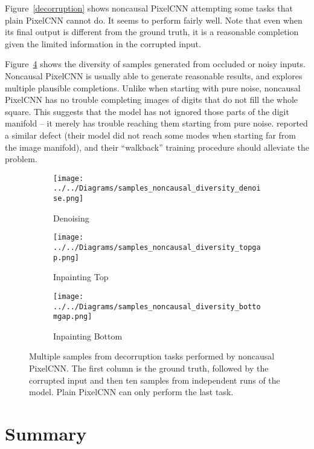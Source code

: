 \documentclass[11pt, a4paper, openany]{book}
\newcommand{\nquote}[1]{``{#1}''}
\begin{document}
Figure~\ref{decorruption} shows noncausal PixelCNN attempting some tasks that plain PixelCNN cannot do. It seems to perform fairly well. Note that even when its final output is different from the ground truth, it is a reasonable completion given the limited information in the corrupted input.

Figure~\ref{diversity} shows the diversity of samples generated from occluded or noisy inputs. Noncausal PixelCNN is usually able to generate reasonable results, and explores multiple plausible completions. Unlike when starting with pure noise, noncausal PixelCNN has no trouble completing images of digits that do not fill the whole square. This suggests that the model has not ignored those parts of the digit manifold -- it merely has trouble reaching them starting from pure noise. \citet{denoisinggenerative} reported a similar defect (their model did not reach some modes when starting far from the image manifold), and their \nquote{walkback} training procedure should alleviate the problem.

\begin{figure}
  \centering    
    \begin{subfigure}{0.32\columnwidth}
        \centering
        \caption{Denoising}
        \texttt{[image: ../../Diagrams/samples\_noncausal\_diversity\_denoise.png]} 
        \label{diversity:denoise}
    \end{subfigure}
    \hfill
    \begin{subfigure}{0.32\columnwidth}
        \centering
        \caption{Inpainting Top}
        \texttt{[image: ../../Diagrams/samples\_noncausal\_diversity\_topgap.png]} 
        \label{diversity:topgap}
    \end{subfigure}
    \hfill
    \begin{subfigure}{0.32\columnwidth}
        \centering
        \caption{Inpainting Bottom}
        \texttt{[image: ../../Diagrams/samples\_noncausal\_diversity\_bottomgap.png]} 
        \label{diversity:bottomgap}
    \end{subfigure}
  \caption[Diversity of decorruption samples]{Multiple samples from decorruption tasks performed by noncausal PixelCNN. The first column is the ground truth, followed by the corrupted input and then ten samples from independent runs of the model. Plain PixelCNN can only perform the last task.}
  \label{diversity}
\end{figure}

\section{Summary}
\end{document}
